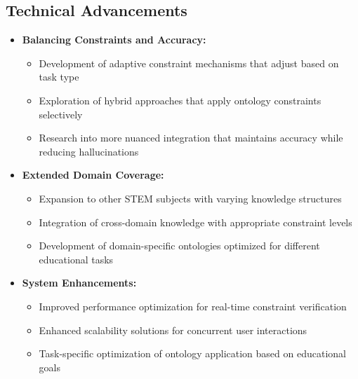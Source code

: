 \subsection{Technical Advancements}
\begin{itemize}
    \item \textbf{Balancing Constraints and Accuracy:} 
        \begin{itemize}
            \item Development of adaptive constraint mechanisms that adjust based on task type
            \item Exploration of hybrid approaches that apply ontology constraints selectively
            \item Research into more nuanced integration that maintains accuracy while reducing hallucinations
        \end{itemize}
    
    \item \textbf{Extended Domain Coverage:} 
        \begin{itemize}
            \item Expansion to other STEM subjects with varying knowledge structures
            \item Integration of cross-domain knowledge with appropriate constraint levels
            \item Development of domain-specific ontologies optimized for different educational tasks
        \end{itemize}
    
    \item \textbf{System Enhancements:}
        \begin{itemize}
            \item Improved performance optimization for real-time constraint verification
            \item Enhanced scalability solutions for concurrent user interactions
            \item Task-specific optimization of ontology application based on educational goals
        \end{itemize}
\end{itemize}

